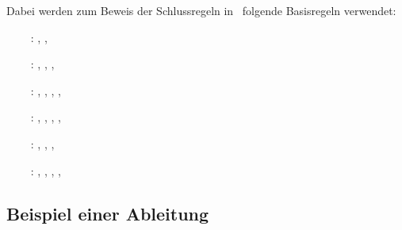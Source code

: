 Dabei werden zum Beweis der Schlussregeln in~\cite{bib:Rautenberg} folgende Basisregeln verwendet:
\begin{itemize}
	\renewcommand*{\itemindent}{1cm}
	\renewcommand*{\labelsep}{5pt}
	\item[\tagnotc~:] \tagAR, \tagMR,           \tagnotb
	\item[\tagnotd~:] \tagAR, \tagMR, \tagnota, \tagnotb
	\item[\tagimpE~:] \tagAR, \tagMR, \tagnota, \tagnotb, \tagandE
	\item[\tagimpB~:] \tagAR, \tagMR, \tagnota, \tagnotb          , \tagandB
	\item[\tagSR  ~:] \tagAR, \tagMR, \tagnota, \tagnotb
	\item[\tagTR  ~:] \tagAR, \tagMR, \tagnota, \tagnotb, \tagandE
\end{itemize}

\subsection{Beispiel einer Ableitung}%
\label{sub:BeispielAbleitung}

